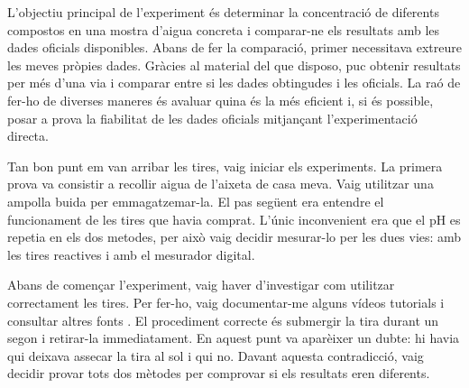 
L’objectiu principal de l'experiment és determinar la concentració de diferents compostos en una mostra d’aigua concreta i comparar-ne els resultats amb les dades oficials disponibles. Abans de fer la comparació, primer necessitava extreure les meves pròpies dades. Gràcies al material del que disposo, puc obtenir resultats per més d’una via i comparar entre si les dades obtingudes i les oficials. La raó de fer-ho de diverses maneres és avaluar quina és la més eficient i, si és possible, posar a prova la fiabilitat de les dades oficials mitjançant l’experimentació directa.

Tan bon punt em van arribar les tires, vaig iniciar els experiments. La primera prova va consistir a recollir aigua de l’aixeta de casa meva. Vaig utilitzar una ampolla buida per emmagatzemar-la. El pas següent era entendre el funcionament de les tires que havia comprat. L’únic inconvenient era que el pH es repetia en els dos metodes, per això vaig decidir mesurar-lo per les dues vies: amb les tires reactives i amb el mesurador digital.


Abans de començar l'experiment, vaig haver d’investigar com utilitzar correctament les tires. Per fer-ho, vaig documentar-me alguns vídeos tutorials \cite{VideosDeSuport} i consultar altres fonts \cite{FontsPerTires}. El procediment correcte és submergir la tira durant un segon i retirar-la immediatament. En aquest punt va aparèixer un dubte: hi havia qui deixava assecar la tira al sol i qui no. Davant aquesta contradicció, vaig decidir provar tots dos mètodes per comprovar si els resultats eren diferents.

